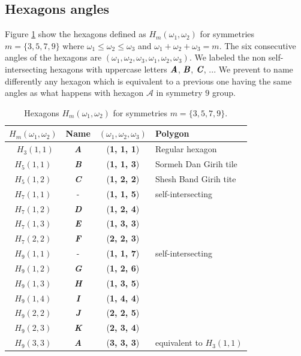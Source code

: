 \documentclass[11pt]{article}
\def\mathbi#1{\textbf{\em #1}}
\begin{document}
\subsection{Hexagons angles}


Figure \ref{tbl:hexagons-angles} show the hexagons defined as $H_m(\omega_1,\omega_2)$ for symmetries $m = \{3,5,7,9\}$ where $\omega_1 \leq \omega_2 \leq \omega_3$ and $\omega_1 + \omega_2 + \omega_3 = m$. The six consecutive angles of the hexagons are $(\omega_1,\omega_2,\omega_3,\omega_1,\omega_2,\omega_3)$. We labeled the non self-intersecting hexagons with uppercase letters $\mathbi{A}$, $\mathbi{B}$, $\mathbi{C}$, ... We prevent to name differently any hexagon which is equivalent to a previous one having the same angles as what happens with hexagon $\mathcal{A}$ in symmetry $9$ group.

\begin{table}[H]
\begin{center}
\begin{tabular}{| c | c | c | l | }
\hline
$H_m(\omega_1,\omega_2)$ & Name & $(\omega_1, \omega_2, \omega_3)$ & Polygon \\ \hline\
$H_3(1,1)$ & \mathbi{A} & (\textbf{1, 1, 1}) & Regular hexagon \\[0.5ex]
\hline
$H_5(1,1)$ & \mathbi{B} & (\textbf{1, 1, 3}) & Sormeh Dan Girih tile\\[0.5ex]
$H_5(1,2)$ & \mathbi{C} & (\textbf{1, 2, 2}) & Shesh Band Girih tite\\[0.5ex]
\hline
$H_7(1,1)$ & -          & (\textbf{1, 1, 5}) & self-intersecting \\[0.5ex]
$H_7(1,2)$ & \mathbi{D} & (\textbf{1, 2, 4}) & \\[0.5ex]
$H_7(1,3)$ & \mathbi{E} & (\textbf{1, 3, 3}) & \\[0.5ex]
$H_7(2,2)$ & \mathbi{F} & (\textbf{2, 2, 3}) & \\[0.5ex]
\hline
$H_9(1,1)$ & -          & (\textbf{1, 1, 7}) & self-intersecting \\[0.5ex]
$H_9(1,2)$ & \mathbi{G} & (\textbf{1, 2, 6}) & \\[0.5ex]
$H_9(1,3)$ & \mathbi{H} & (\textbf{1, 3, 5}) & \\[0.5ex]
$H_9(1,4)$ & \mathbi{I} & (\textbf{1, 4, 4}) & \\[0.5ex]
$H_9(2,2)$ & \mathbi{J} & (\textbf{2, 2, 5}) & \\[0.5ex]
$H_9(2,3)$ & \mathbi{K} & (\textbf{2, 3, 4}) & \\[0.5ex]
$H_9(3,3)$ & \mathbi{A} & (\textbf{3, 3, 3}) & equivalent to $H_3(1,1)$\\[1.1ex]
\hline
\end{tabular}
\caption{Hexagons $H_m(\omega_1,\omega_2)$ for symmetries $m = \{3,5,7,9\}$.} 
\label{tbl:hexagons-angles}
\end{center}
\end{table}
\end{document}
